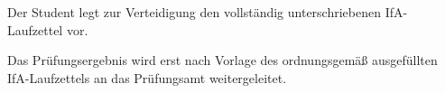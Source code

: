 \begin{compactitem}
  \item Der Student legt zur Verteidigung den vollständig unterschriebenen IfA-Laufzettel vor.
  \item Das Prüfungsergebnis wird erst nach Vorlage des ordnungsgemäß ausgefüllten IfA-Laufzettels an das Prüfungsamt weitergeleitet.
\end{compactitem}